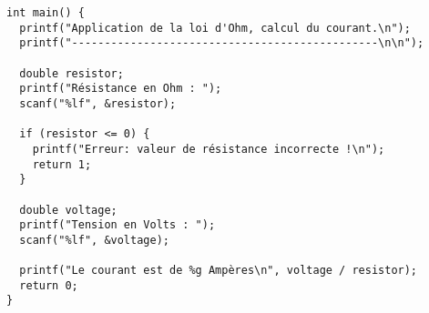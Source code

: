 \documentclass[french,a4paper,addpoints,11pt]{exam}
\begin{document}
\begin{questions}
\begin{solution}
\begin{lstlisting}
int main() {
  printf("Application de la loi d'Ohm, calcul du courant.\n");
  printf("-----------------------------------------------\n\n");
  
  double resistor;
  printf("Résistance en Ohm : ");
  scanf("%lf", &resistor);

  if (resistor <= 0) { 
    printf("Erreur: valeur de résistance incorrecte !\n");
    return 1;
  }

  double voltage;
  printf("Tension en Volts : ");
  scanf("%lf", &voltage);
  
  printf("Le courant est de %g Ampères\n", voltage / resistor);
  return 0;
}
\end{lstlisting}
\end{solution}
\else
\makeemptybox{10cm}
\fi

\end{questions}
\end{document}
